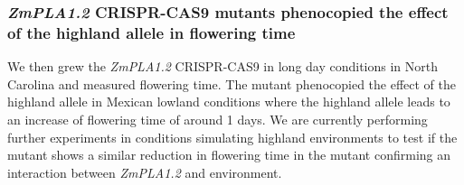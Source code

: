 \documentclass[9pt,twocolumn,twoside]{BioRxiv}
\begin{document}
\subsubsection{\textit{ZmPLA1.2} CRISPR-CAS9 mutants phenocopied the effect of the highland allele in flowering time}
We then grew the \textit{ZmPLA1.2} CRISPR-CAS9 in long day conditions in North Carolina and measured flowering time. 
The mutant phenocopied the effect of the highland allele in Mexican lowland conditions where the highland allele leads to an increase of flowering time of around 1 days. 
We are currently performing further experiments in conditions simulating highland environments to test if the mutant shows a similar reduction in flowering time in the mutant confirming an interaction between \textit{ZmPLA1.2} and environment.
\end{document}
